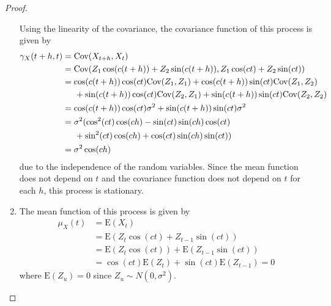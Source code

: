 \documentclass[12pt]{article}
\theoremstyle{definition}
\newcommand{\E}{\text{E}}
\newcommand{\Co}[2]{\text{Cov}({#1}, {#2})}
\newcommand{\mx}[1][t]{\mu_X({#1})}
\newcommand{\gx}[2]{\gamma_X({#1}, {#2})}
\begin{document}
\begin{proof}
\begin{enumerate}
      Using the linearity of the covariance, the covariance function of this
      process is given by
      \begin{align*}
        \gx{t+h}{t} &= \Co{X_{t+h}}{X_t} \\
        &= \Co{Z_1 \cos(c(t+h))+ Z_2 \sin(c(t+h))} {Z_1 \cos(ct)+ Z_2 \sin(ct)} \\
        &= \cos(c(t+h))\cos(ct)\Co{Z_1}{Z_1} + \cos(c(t+h))\sin(ct)\Co{Z_1}{Z_2} \\
        & \hspace{5mm} + \sin(c(t+h))\cos(ct)\Co{Z_2}{Z_1} + \sin(c(t+h))\sin(ct)\Co{Z_2}{Z_2} \\
        &= \cos(c(t+h))\cos(ct) \sigma^2 + \sin(c(t+h))\sin(ct) \sigma^2 \\
        &= \sigma^2(\cos^2(ct)\cos(ch) - \sin(ct)\sin(ch)\cos(ct) \\
        &\hspace{5mm}+ \sin^2(ct)\cos(ch) + \cos(ct)\sin(ch)\sin(ct)) \\
        &= \sigma^2 \cos(ch)
      \end{align*}
      due to the independence of the random variables. Since the mean function
      does not depend on $t$ and the covariance function does not depend on $t$
      for each $h$, this process is stationary.
    \item The mean function of this process is given by
      \begin{align*}
        \mx &= \E(X_t) \\
        &= \E(Z_t \cos(ct)+ Z_{t-1} \sin(ct))\\
        &= \E(Z_t \cos(ct))+ \E(Z_{t-1} \sin(ct)) \\
        &= \cos(ct)\E(Z_t)+ \sin(ct)\E(Z_{t-1}) = 0
      \end{align*}
      where $\E(Z_u) = 0$ since $Z_u \sim N(0, \sigma^2)$.


\end{enumerate}
\end{proof}
\end{document}
